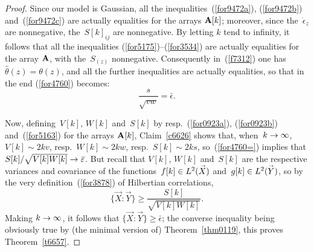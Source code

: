 \begin{proof}
Since our model is Gaussian,
all the inequalities~(\ref{for9472a}), (\ref{for9472b}) and~(\ref{for9472c})
are actually equalities for the arrays $\mathbf{A}[k]$;
moreover, since the~$\dot\epsilon_z$ are nonnegative,
the~$S[k]_{ij}$ are nonnegative.
By letting $k$ tend to infinity, it follows that
all the inequalities (\ref{for5175})--(\ref{for3534}) are actually equalities for the array $\mathbf{A}$,
with the~$S_{(z)}$ nonnegative.
Consequently in~(\ref{f7312}) one has $\hat\theta(z) = \theta(z)$,
and all the further inequalities are actually equalities, so that in the end
(\ref{for4760}) becomes:
\[\label{for4760=} \frac{s}{\sqrt{vw}} = \bar\epsilon .\]

Now, defining~$V[k]$, $W[k]$ and~$S[k]$
by resp.~(\ref{for0923a}), (\ref{for0923b}) and~(\ref{for5163}) for the arrays $\mathbf{A}[k]$,
Claim~\ref{c6626} shows that, when~$k \to \infty$,
$V[k] \sim 2kv$, resp.\ $W[k] \sim 2kw$, resp.\ $S[k] \sim 2ks$,
so~(\ref{for4760=}) implies that $S[k]/\sqrt{V[k]W[k]} \longto \bar\epsilon$.
But recall that $V[k]$, $W[k]$ and~$S[k]$ are the respective variances and covariance
of the functions~$f[k] \in \ldb(\vec{X})$ and~$g[k] \in \ldb(\vec{Y})$,
so by the very definition~(\ref{for3878}) of Hilbertian correlations,
\[ \{\vec{X} : \vec{Y}\} \geq \frac{S[k]}{\sqrt{V[k]W[k]}} .\]
Making $k \to \infty$, it follows that $\{\vec{X}:\vec{Y}\} \geq \bar\epsilon$;
the converse inequality being obviously true
by (the minimal version of) Theorem~\ref{thm0119}, this proves Theorem~\ref{t6657}.
\end{proof}\endgroup

